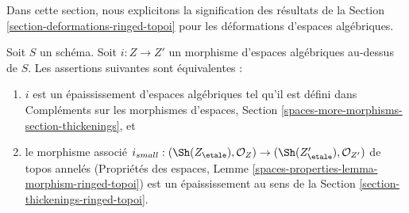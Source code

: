 \noindent
Dans cette section, nous explicitons la signification des résultats de la
Section \ref{section-deformations-ringed-topoi} pour les déformations d'espaces
algébriques.

\begin{lemma}
\label{lemma-match-thickenings}
Soit $S$ un schéma. Soit $i : Z \to Z'$ un morphisme d'espaces algébriques
au-dessus de $S$. Les assertions suivantes sont équivalentes :
\begin{enumerate}
\item $i$ est un épaississement d'espaces algébriques tel qu'il est défini dans
Compléments sur les morphismes d'espaces, Section
\ref{spaces-more-morphisms-section-thickenings}, et
\item le morphisme associé
$i_{small} : (\Sh(Z_\etale), \mathcal{O}_Z) \to
(\Sh(Z'_\etale), \mathcal{O}_{Z'})$
de topos annelés (Propriétés des espaces, Lemme
\ref{spaces-properties-lemma-morphism-ringed-topoi}) est un épaississement au
sens de la Section \ref{section-thickenings-ringed-topoi}.
\end{enumerate}
\end{lemma}

